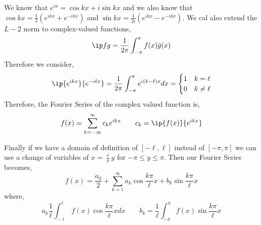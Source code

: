 \noindent
We know that $e^{ix} = \cos kx + i \sin kx$ and we also know that $\cos kx = \frac{1}{2}\left( e^{ikx} + e^{-ikx}\right)$ and $\sin kx = \frac{1}{2i}\left( e^{ikx} - e^{-ikx} \right)$. We cal also extend the $L-2$ norm to complex-valued functions,
$$ \ip f g = \frac{1}{2\pi}\int_{-\pi}^\pi f(x)\bar g(x) $$
Therefore we consider,
$$ \ip{e^{ikx}}{e^{-i\ell x}} = \frac{1}{2\pi}\int_{-\pi}^\pi e^{i(k - \ell)x}dx = \begin{cases}
  1 & k = \ell \\
  0 & k \ne \ell
\end{cases} $$
Therefore, the Fourier Series of the complex valued function is,
$$ f(x) = \sum_{k = -\infty}^\infty c_k e^{ikx} \qquad c_k = \ip{f(x)}{e^{ikx}} $$


\noindent
Finally if we have a domain of definition of $[-\ell, \ell]$ instead of $[-\pi, \pi]$ we can use a change of variables of $x = \frac{\ell}{\pi}y$ for $- \pi \le y \le \pi$. Then our Fourier Series becomes,
$$ f(x) = \frac{a_0}{2} + \sum_{k=1}^\infty a_k\cos \frac{k\pi}{\ell}x + b_k\sin \frac{k\pi}{\ell}x $$
where,
$$ a_k \frac{1}{\ell}\int_{-\ell}^\ell f(x)\cos \frac{k\pi}{\ell}x dx \qquad b_k = \frac{1}{\ell}\int_{-\pi}^\pi f(x)\sin \frac{k\pi}{\ell}x $$

